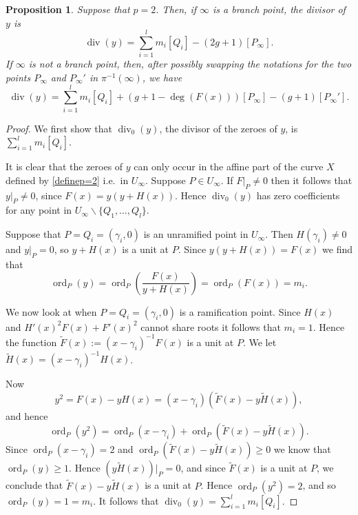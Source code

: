 \documentclass[11pt]{article} %
\theoremstyle{plain}
\newtheorem{prop}[defn]{Proposition}
\theoremstyle{remark}
\DeclareMathOperator{\ord}{ord}
\DeclareMathOperator{\di}{div}
\begin{document}
\begin{prop}\label{divyp=2}
Suppose that $p=2$.
Then, if $\infty$ is a branch point, the divisor of $y$ is
\begin{equation*}
\di(y) = 
 {\displaystyle \sum_{i=1}^l} m_i[Q_i] -(2g+1)[P_\infty].
\end{equation*}
If $\infty$ is not a branch point, then, after possibly swapping the notations for the two points $P_\infty$ and $P_\infty'$ in $\pi^{-1}(\infty)$, we have
\begin{equation*}
 \di(y) = {\displaystyle \sum_{i=1}^l} m_i[Q_i] +(g+1-\deg(F(x)))[P_\infty] - (g+1)[P_\infty'].
\end{equation*}
\end{prop}
\begin{proof}
We first show that $\di_0(y)$, the divisor of the zeroes of $y$, is $\sum_{i=1}^l m_i [Q_i]$.

It is clear that the zeroes of $y$ can only occur in the affine part of the curve $X$ defined by \eqref{definep=2} i.e.~in $U_\infty$.
Suppose $P\in U_\infty$.
If $\left. F \right|_P \neq 0$ then it follows that $y|_P \neq 0$, since $F(x) = y (y + H(x))$.
Hence $\di_0(y)$ has zero coefficients for any point in $U_\infty\backslash \{Q_1, \ldots, Q_l \}$.

Suppose that $P= Q_i = (\gamma_i, 0)$ is an unramified point in $U_\infty$.
Then $H(\gamma_i) \neq 0$ and $\left. y \right|_P = 0$, so $y + H(x)$ is a unit at $P$.
Since $y(y+H(x)) = F(x)$ we find that
\begin{equation*}
\ord_P(y) = \ord_P\left( \frac{F(x)}{y + H(x)} \right) = \ord_P(F(x)) = m_i.
\end{equation*}

We now look at when $P = Q_i = (\gamma_i, 0)$ is a ramification point.
Since $H(x)$ and $H'(x)^2F(x) + F'(x)^2$ cannot share roots it follows that $m_i = 1$.
Hence the function $\tilde F(x) := (x- \gamma_i)^{-1}F(x)$ is a unit at $P$.
We let $\tilde H(x) = (x- \gamma_i)^{-1}H(x)$.


Now 
\[
y^2 = F(x) - y H(x) = (x- \gamma_i) \left(\tilde F(x) - y \tilde H(x)\right),
\]
and hence
\[
\ord_P(y^2 ) = \ord_P(x-\gamma_i) + \ord_P(\tilde F(x) - y \tilde H(x)).
\]
Since $\ord_P(x-\gamma_i) = 2$ and $\ord_P\left(\tilde F(x) - y \tilde H(x)\right) \geq 0$ we know that $\ord_P(y) \geq 1$.
Hence $(y \tilde H(x)) \big|_P = 0$, and since $\tilde F(x)$ is a unit at $P$, we conclude that $\tilde F(x) - y \tilde H(x)$ is a unit at $P$.
Hence $\ord_P(y^2) = 2$, and so $\ord_P(y) = 1 = m_i$.
It follows that $\di_0(y) =  \sum_{i=1}^l m_i [Q_i]$.


\end{proof}
\end{document}
